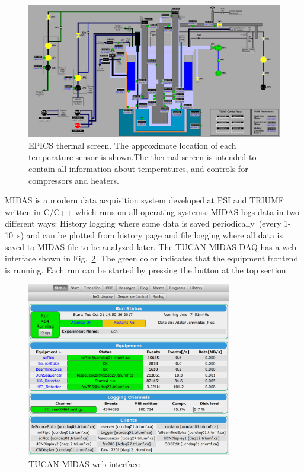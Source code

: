 \begin{figure}[h!]
  \centering
  \includegraphics[width=1.0\textwidth]{epics.png}
  \caption{EPICS thermal screen. The approximate location of each
    temperature sensor is shown.The thermal screen is intended to
    contain all information about temperatures, and controls for
    compressors and heaters. }
  \label{fig:epics}
\end{figure}

MIDAS is a modern data acquisition system developed at PSI and TRIUMF
written in C/C++ which runs on all operating systems. MIDAS logs data
in two different ways: History logging where some data is saved
periodically~(every 1-10~s) and can be plotted from history page and
file logging where all data is saved to MIDAS file to be analyzed
later. The TUCAN MIDAS DAQ has a web interface shown in
Fig.~\ref{fig:midas}. The green color indicates that the equipment
frontend is running. Each run can be started by pressing the button at
the top section.

\begin{figure}[h!]
  \centering
  \includegraphics[width=0.8\textwidth]{midas.png}
  \caption{TUCAN MIDAS web interface }
  \label{fig:midas}
\end{figure}



